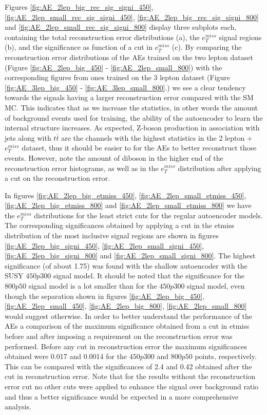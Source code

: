 Figures \ref{fig:AE_2lep_big_rec_sig_signi_450}, \ref{fig:AE_2lep_small_rec_sig_signi_450}, 
\ref{fig:AE_2lep_big_rec_sig_signi_800} and \ref{fig:AE_2lep_small_rec_sig_signi_800} display three 
subplots each, containing the total reconstruction error distributions (a), the $e_T^{miss}$ signal regions (b), 
and the significance as function of a cut in $e_T^{miss}$ (c). 
By comparing the reconstruction error distributions of the AEs trained on the two lepton dataset 
(Figure \ref{fig:AE_2lep_big_450} - \ref{fig:AE_2lep_small_800}) with the corresponding figures from ones trained on the 3 lepton dataset 
(Figure \ref{fig:AE_3lep_big_450} - \ref{fig:AE_3lep_small_800}.) we see a clear tendency towards the signals having a larger reconstruction 
error compared with the SM MC. This indicates that as we increase the 
statistics, in other words the amount of background events 
used for training, the ability of the autoencoder to learn the internal structure increases. 
As expected, Z-boson production in association with jets along with $t\bar{t}$ are the channels with the highest statistics 
in the 2 lepton + $e_T^{miss}$ dataset, thus it should be easier to for the AEs to better reconstruct 
those events. However, note the amount of diboson in the higher end of the reconstruction error 
histograms, as well as in the $e_T^{miss}$ distribution after applying a cut on the reconstruction error.  \par
In figures \ref{fig:AE_2lep_big_etmiss_450}, \ref{fig:AE_2lep_small_etmiss_450}, \ref{fig:AE_2lep_big_etmiss_800} and  
\ref{fig:AE_2lep_small_etmiss_800} we have the $e_T^{miss}$ distributions for 
the least strict cuts for the regular autoencoder models. 
The corresponding significances obtained by applying a cut in the etmiss distribution of the most inclusive 
signal regions are shown in figures \ref{fig:AE_2lep_big_signi_450}, \ref{fig:AE_2lep_small_signi_450}, \ref{fig:AE_2lep_big_signi_800} 
and  \ref{fig:AE_2lep_small_signi_800}. The highest significance (of about 1.75) was found with the shallow autoencoder 
with the SUSY $450p300$ signal model. It should be noted that the significance 
for the $800p50$ signal model is a lot smaller than for the $450p300$ signal model, even though the separation 
shown in figures \ref{fig:AE_2lep_big_450}, \ref{fig:AE_2lep_small_450}, \ref{fig:AE_2lep_big_800}, 
\ref{fig:AE_2lep_small_800} would suggest otherwise. 
In order to better understand the performance of the AEs a comparison of the maximum significance obtained from a 
cut in etmiss before and after imposing a requirement on the reconstruction error was performed. Before any cut 
in reconstruction error the maximum significances obtained were 0.017 and 0.0014 for the $450p300$ and $800p50$ 
points, respectively. This can be compared with the significances of 2.4 and 0.42 obtained after the cut in 
reconstruction error. Note that for the results without the reconstruction error cut no other cuts were 
applied to enhance the signal over background ratio and thus a better significance would be expected in a 
more comprehensive analysis.

